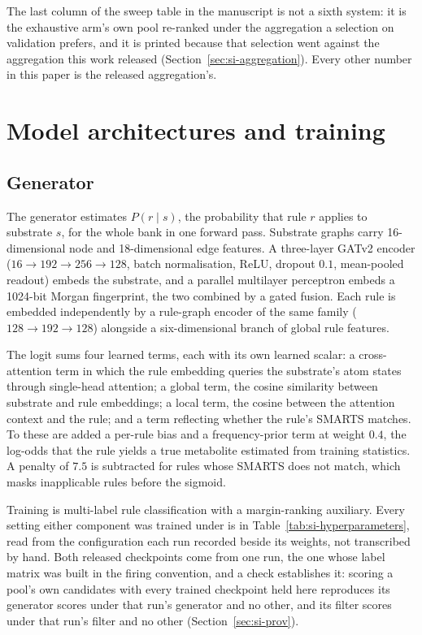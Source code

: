 \documentclass[journal=jcisd8,manuscript=suppinfo,layout=onecolumn]{achemso}
\begin{document}
The last column of the sweep table in the manuscript is not a sixth system: it is the
exhaustive arm's own pool re-ranked under the aggregation a selection on validation prefers, and
it is printed because that selection went against the aggregation this work released
(Section~\ref{sec:si-aggregation}). Every other number in this paper is the released
aggregation's.

\section{Model architectures and training}
\label{sec:si-arch}

\subsection{Generator}

The generator estimates $P(r \mid s)$, the probability that rule $r$ applies to substrate $s$,
for the whole bank in one forward pass. Substrate graphs carry 16-dimensional node and
18-dimensional edge features. A three-layer GATv2 encoder ($16 \to 192 \to 256 \to 128$, batch
normalisation, ReLU, dropout $0.1$, mean-pooled readout) embeds the substrate, and a parallel
multilayer perceptron embeds a 1024-bit Morgan fingerprint, the two combined by a gated fusion.
Each rule is embedded independently by a rule-graph encoder of the same family
($128 \to 192 \to 128$) alongside a six-dimensional branch of global rule features.

The logit sums four learned terms, each with its own learned scalar: a cross-attention term in
which the rule embedding queries the substrate's atom states through single-head attention; a
global term, the cosine similarity between substrate and rule embeddings; a local term, the cosine
between the attention context and the rule; and a term reflecting whether the rule's SMARTS
matches. To these are added a per-rule bias and a frequency-prior term at weight $0.4$, the
log-odds that the rule yields a true metabolite estimated from training statistics. A penalty of
$7.5$ is subtracted for rules whose SMARTS does not match, which masks inapplicable rules before
the sigmoid.

Training is multi-label rule classification with a margin-ranking auxiliary. Every setting either
component was trained under is in Table~\ref{tab:si-hyperparameters}, read from the configuration
each run recorded beside its weights, not transcribed by hand. Both released checkpoints come from
one run, the one whose label matrix was built in the firing convention, and a check establishes it:
scoring a pool's own candidates with every trained checkpoint held here
reproduces its generator scores under that run's generator and no other, and its filter scores
under that run's filter and no other (Section~\ref{sec:si-prov}).
\end{document}
